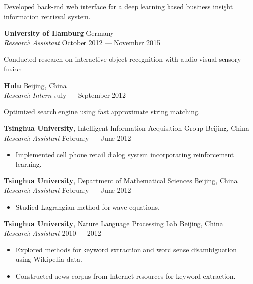 \documentclass[a4paper,9pt]{extarticle} %
\begin{document}
Developed back-end web interface for a deep learning based business insight information retrieval system.


\textbf{University of Hamburg} \hfill Germany \\
\textit{Research Assistant}  \hfill October 2012 --- November 2015%
\vspace{-.5\parskip}

Conducted research on interactive object recognition with audio-visual sensory fusion.


\textbf{Hulu} \hfill Beijing, China \\
\textit{Research Intern} \hfill July --- September 2012%
\vspace{-.5\parskip}

Optimized search engine using fast approximate string matching.


\iffalse{}

\textbf{Tsinghua University}, Intelligent Information Acquisition Group \hfill Beijing, China \\
\textit{Research Assistant} \hfill February --- June 2012
\vspace{-\parskip}
\begin{itemize}
  \item Implemented cell phone retail dialog system incorporating reinforcement learning.
\end{itemize}


\textbf{Tsinghua University}, Department of Mathematical Sciences \hfill Beijing, China \\
\textit{Research Assistant} \hfill February --- June 2012
\vspace{-\parskip}
\begin{itemize}
  \item Studied Lagrangian method for wave equations.
\end{itemize}


\textbf{Tsinghua University}, Nature Language Processing Lab \hfill Beijing, China \\
\textit{Research Assistant} \hfill 2010 --- 2012
\vspace{-\parskip}
\begin{itemize}
  \item Explored methods for keyword extraction and word sense disambiguation using Wikipedia data.
  \item Constructed news corpus from Internet resources for keyword extraction.
\end{itemize}
\end{document}
